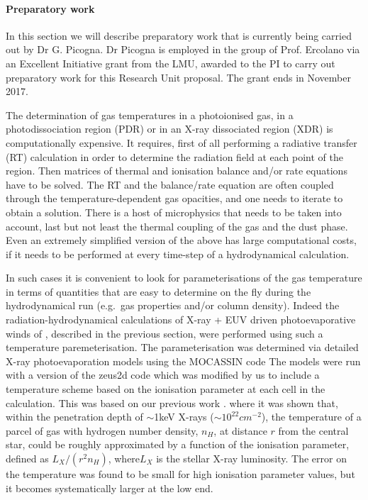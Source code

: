 \documentclass[10pt,fleqn,twoside]{article}
\begin{document}
\paragraph{Preparatory work}

In this section we will describe
preparatory work that is currently being carried out by Dr
G. Picogna. Dr Picogna is employed in the group of Prof. Ercolano via
an Excellent Initiative grant from the LMU, awarded to the PI to carry
out preparatory work for this Research Unit proposal. The grant ends in November
2017. 

The determination of gas temperatures in a photoionised gas, in a
photodissociation region (PDR) or in an X-ray dissociated region (XDR)
is computationally expensive. It requires, first of all 
performing a radiative transfer (RT) calculation in order to determine the
radiation field at each point of the region. Then matrices of thermal and
ionisation balance and/or rate equations have to be solved. The RT and
the balance/rate equation are often coupled through the
temperature-dependent gas opacities, and one needs to iterate to
obtain a solution. There is a host of microphysics
that needs to be taken into account, last but not least the thermal
coupling of the gas and the dust phase. Even an extremely simplified
version of the above has large computational costs, if it needs to be performed at
every time-step of a hydrodynamical calculation. 

In such cases it is convenient to look for parameterisations of the
gas temperature in terms of quantities that are easy to determine on
the fly during the hydrodynamical run (e.g.\ gas properties and/or column density). 
Indeed the radiation-hydrodynamical calculations of X-ray + EUV driven
photoevaporative winds of 
\citet{2010MNRAS.401.1415O, 2011MNRAS.412...13O, 2012MNRAS.422.1880O},
described in the previous section, were performed
using such a temperature paremeterisation. The parameterisation was
determined via detailed X-ray photoevaporation models using the
MOCASSIN code 
\citep{2008ApJ...688..398E, 2009ApJ...699.1639E}
The models were run with a version of the {\sc
  zeus2d} code which was modified by us to include a temperature
scheme based on the ionisation parameter at each cell in the
calculation. 
This was based on our previous work 
\citep{2008ApJ...688..398E, 2009ApJ...699.1639E}.
where it was shown that, within the
penetration depth of $\sim$1keV X-rays ($\sim 10^{22}cm^{-2}$), the
temperature of a parcel of gas with hydrogen number density, $n_H$, at
distance $r$ from the central star, could be roughly approximated by a
function of the ionisation parameter, defined as $L_X/(r^2 n_H)$,
where$L_X$ is the stellar X-ray luminosity. The error on the
temperature was found to be small for high ionisation parameter values, but it
becomes systematically larger at the low end. 
\end{document}
